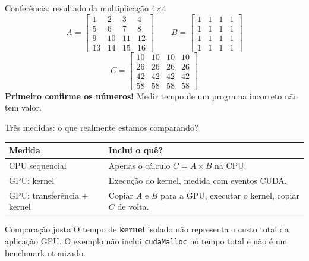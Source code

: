 \documentclass[aspectratio=169,11pt]{beamer}
\begin{document}
\begin{frame}{Conferência: resultado da multiplicação 4$\times$4}
\centering
\[A=\begin{bmatrix}1&2&3&4\\5&6&7&8\\9&10&11&12\\13&14&15&16\end{bmatrix}
\qquad
B=\begin{bmatrix}1&1&1&1\\1&1&1&1\\1&1&1&1\\1&1&1&1\end{bmatrix}\]
\vspace{-1mm}
\[\boxed{C=\begin{bmatrix}10&10&10&10\\26&26&26&26\\42&42&42&42\\58&58&58&58\end{bmatrix}}\]
\vspace{1mm}
\small \textbf{Primeiro confirme os números!} Medir tempo de um programa incorreto não tem valor.
\end{frame}

\begin{frame}{Três medidas: o que realmente estamos comparando?}
\renewcommand{\arraystretch}{1.35}
\begin{tabular}{p{.31\linewidth}p{.60\linewidth}}
\toprule
\textbf{Medida} & \textbf{Inclui o quê?}\\
\midrule
CPU sequencial & Apenas o cálculo \(C=A\times B\) na CPU.\\
GPU: kernel & Execução do kernel, medida com eventos CUDA.\\
GPU: transferência + kernel & Copiar \(A\) e \(B\) para a GPU, executar o kernel, copiar \(C\) de volta.\\
\bottomrule
\end{tabular}
\vspace{4mm}
\begin{alertblock}{Comparação justa}
O tempo de \textbf{kernel} isolado não representa o custo total da aplicação GPU. O exemplo não inclui \texttt{cudaMalloc} no tempo total e não é um benchmark otimizado.
\end{alertblock}
\end{frame}
\end{document}
